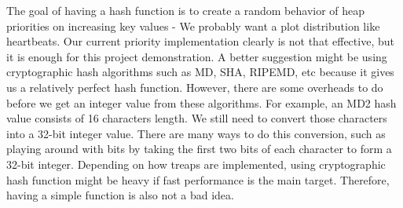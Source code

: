 The goal of having a hash function is to create a random behavior of heap priorities on increasing key values - We probably want a plot distribution like heartbeats. Our current priority implementation clearly is not that effective, but it is enough for this project demonstration. A better suggestion might be using cryptographic hash algorithms such as MD, SHA, RIPEMD, etc because it gives us a relatively perfect hash function. However, there are some overheads to do before we get an integer value from these algorithms. For example, an MD2 hash value consists of 16 characters length. We still need to convert those characters into a 32-bit integer value. There are many ways to do this conversion, such as playing around with bits by taking the first two bits of each character to form a 32-bit integer. Depending on how treaps are implemented, using cryptographic hash function might be heavy if fast performance is the main target. Therefore, having a simple function is also not a bad idea.


